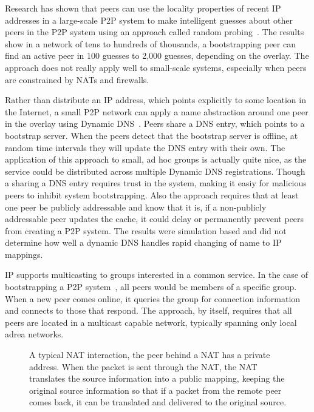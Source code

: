 \documentclass[conference]{IEEEtran}
\begin{document}
Research has shown that peers can use the locality properties of recent IP
addresses in a large-scale P2P system to make intelligent guesses about other
peers in the P2P system using an approach called random
probing~\cite{bootstrapping_p2p, locality_aware}.  The results show in a
network of tens to hundreds of thousands, a bootstrapping peer can find an
active peer in 100 guesses to 2,000 guesses, depending on the overlay.  The
approach does not really apply well to small-scale systems, especially when
peers are constrained by NATs and firewalls.

Rather than distribute an IP address, which points explicitly to some location
in the Internet, a small P2P network can apply a name abstraction around one
peer in the overlay using Dynamic DNS~\cite{bootstrapping_ddns}.  Peers share a
DNS entry, which points to a bootstrap server.  When the peers detect that the
bootstrap server is offline, at random time intervals they will update the DNS
entry with their own.  The application of this approach to small, ad hoc groups
is actually quite nice, as the service could be distributed across multiple
Dynamic DNS registrations.  Though a sharing a DNS entry requires trust in the
system, making it easiy for malicious peers to inhibit system bootstrapping.
Also the approach requires that at least one peer be publicly addressable and
know that it is, if a non-publicly addressable peer updates the cache, it could
delay or permanently prevent peers from creating a P2P system.  The results
were simulation based and did not determine how well a dynamic DNS handles
rapid changing of name to IP mappings.

IP supports multicasting to groups interested in a common service.  In the case
of bootstrapping a P2P system~\cite{pastry, locality_aware}, all peers would be
members of a specific group.  When a new peer comes online, it queries the
group for connection information and connects to those that respond.  The
approach, by itself, requires that all peers are located in a multicast capable
network, typically spanning only local adrea networks.

\begin{figure*}[h!t!]
\centering
{}
\caption{A typical NAT interaction, the peer behind a NAT has a private address.
When the packet is sent through the NAT, the NAT translates the source information
into a public mapping, keeping the original source information so that if a
packet from the remote peer comes back, it can be translated and delivered to
the original source.}
\label{fig:nat}
\end{figure*}
\end{document}
